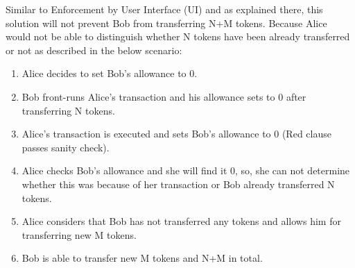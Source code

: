 \noindent Similar to \textsf{Enforcement by User Interface (UI)} and as explained there, this solution will not prevent Bob from transferring N+M tokens. Because Alice would not be able to distinguish whether N tokens have been already transferred or not as described in the below scenario:
\begin{enumerate}
	\item Alice decides to set Bob’s allowance to 0.
	\item Bob front-runs Alice’s transaction and his allowance sets to 0 after transferring N tokens.
	\item Alice’s transaction is executed and sets Bob’s allowance to 0 (Red clause passes sanity check).
	\item Alice checks Bob’s allowance and she will find it 0, so, she can not determine whether this was because of her transaction or Bob already transferred N tokens.
	\item Alice considers that Bob has not transferred any tokens and allows him for transferring new M tokens.
	\item Bob is able to transfer new M tokens and N+M in total.
\end{enumerate}

